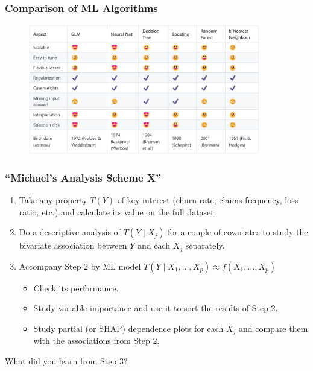 \documentclass[
    utf8,
    aspectratio=169
]{beamer}  %
\begin{document}
\begin{frame}
	\frametitle{Comparison of ML Algorithms}
		\begin{figure}
		\includegraphics[width=0.9\textwidth]{pics/algorithms.png}
	\end{figure}
\end{frame}

\begin{frame}
	\frametitle{``Michael’s Analysis Scheme X''}
	\begin{enumerate}
		\item Take any property $T(Y)$ of key interest (churn rate, claims frequency, loss ratio, etc.) and calculate its value on the full dataset.
		\item Do a descriptive analysis of $T(Y \mid X_j)$ for a couple of covariates to study the bivariate association between $Y$ and each $X_j$ separately.
		\item Accompany Step 2 by ML model $T(Y\mid X_1, \dots, X_p) \approx f(X_1, \dots, X_p)$
			\begin{itemize}
				\item Check its performance.
				\item Study variable importance and use it to sort the results of Step 2.
				\item Study partial (or SHAP) dependence plots for each $X_j$ and compare them with the associations from Step 2.
			\end{itemize}
	\end{enumerate}

	\vfill
	
	\begin{block}{What did you learn from Step 3?}
	\end{block}
\end{frame}

\end{document}
